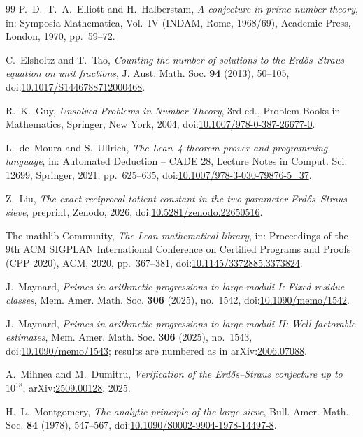 \documentclass[aps,prd,twocolumn,superscriptaddress,nofootinbib,longbibliography,floatfix,showkeys,nobalancelastpage,amsmath,amssymb,10pt]{revtex4-2}
\theoremstyle{plain}
\theoremstyle{definition}
\theoremstyle{plain}
\begin{document}
\begin{thebibliography}{99}
P.~D.~T.~A.~Elliott and H.~Halberstam, \emph{A conjecture in prime number theory}, in: Symposia Mathematica, Vol.~IV (INDAM, Rome, 1968/69), Academic Press, London, 1970, pp.~59--72.

C.~Elsholtz and T.~Tao, \emph{Counting the number of solutions to the Erd\H{o}s--Straus equation on unit fractions}, J. Aust. Math. Soc. \textbf{94} (2013), 50--105, doi:\href{https://doi.org/10.1017/S1446788712000468}{10.1017/S1446788712000468}.

R.~K.~Guy, \emph{Unsolved Problems in Number Theory}, 3rd ed., Problem Books in Mathematics, Springer, New York, 2004, doi:\href{https://doi.org/10.1007/978-0-387-26677-0}{10.1007/978-0-387-26677-0}.

L.~de~Moura and S.~Ullrich, \emph{The Lean~4 theorem prover and programming language}, in: Automated Deduction -- CADE 28, Lecture Notes in Comput. Sci. 12699, Springer, 2021, pp.~625--635, doi:\href{https://doi.org/10.1007/978-3-030-79876-5_37}{10.1007/978-3-030-79876-5\_37}.

Z.~Liu, \emph{The exact reciprocal-totient constant in the two-parameter Erd\H{o}s--Straus sieve}, preprint, Zenodo, 2026, doi:\href{https://doi.org/10.5281/zenodo.22650516}{10.5281/zenodo.22650516}.

The mathlib Community, \emph{The Lean mathematical library}, in: Proceedings of the 9th ACM SIGPLAN International Conference on Certified Programs and Proofs (CPP 2020), ACM, 2020, pp.~367--381, doi:\href{https://doi.org/10.1145/3372885.3373824}{10.1145/3372885.3373824}.

J.~Maynard, \emph{Primes in arithmetic progressions to large moduli I: Fixed residue classes}, Mem. Amer. Math. Soc. \textbf{306} (2025), no.~1542, doi:\href{https://doi.org/10.1090/memo/1542}{10.1090/memo/1542}.

J.~Maynard, \emph{Primes in arithmetic progressions to large moduli II: Well-factorable estimates}, Mem. Amer. Math. Soc. \textbf{306} (2025), no.~1543, doi:\href{https://doi.org/10.1090/memo/1543}{10.1090/memo/1543}; results are numbered as in arXiv:\href{https://arxiv.org/abs/2006.07088}{2006.07088}.

A.~Mihnea and M.~Dumitru, \emph{Verification of the Erd\H{o}s--Straus conjecture up to $10^{18}$}, arXiv:\href{https://arxiv.org/abs/2509.00128}{2509.00128}, 2025.

H.~L.~Montgomery, \emph{The analytic principle of the large sieve}, Bull. Amer. Math. Soc. \textbf{84} (1978), 547--567, doi:\href{https://doi.org/10.1090/S0002-9904-1978-14497-8}{10.1090/S0002-9904-1978-14497-8}.


\end{thebibliography}
\end{document}
